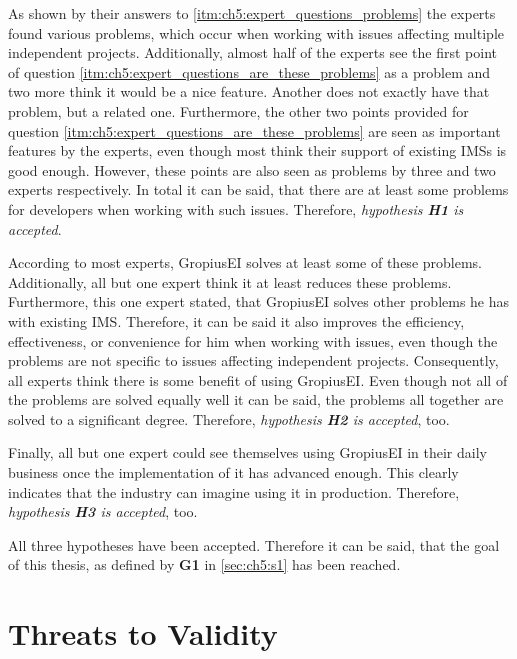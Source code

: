 As shown by their answers to \ref{itm:ch5:expert_questions_problems} the experts found various problems, which occur when working with issues affecting multiple independent projects.
Additionally, almost half of the experts see the first point of question \ref{itm:ch5:expert_questions_are_these_problems} as a problem and two more think it would be a nice feature.
Another does not exactly have that problem, but a related one.
Furthermore, the other two points provided for question \ref{itm:ch5:expert_questions_are_these_problems}  are seen as important features by the experts, even though most think their support of existing \glspl{IMS} is good enough.
However, these points are also seen as problems by three and two experts respectively.
In total it can be said, that there are at least some problems for developers when working with such issues.
Therefore, \emph{hypothesis \textbf{H1} is accepted}.

According to most experts, \gls{GropiusEI} solves at least some of these problems.
Additionally, all but one expert think it at least reduces these problems.
Furthermore, this one expert stated, that \gls{GropiusEI} solves other problems he has with existing \gls{IMS}.
Therefore, it can be said it also improves the efficiency, effectiveness, or convenience for him when working with issues,
even though the problems are not specific to issues affecting independent projects.
Consequently, all experts think there is some benefit of using \gls{GropiusEI}.
Even though not all of the problems are solved equally well it can be said, the problems all together are solved to a significant degree.
Therefore, \emph{hypothesis \textbf{H2} is accepted}, too.

Finally, all but one expert could see themselves using \gls{GropiusEI} in their daily business once the implementation of it has advanced enough.
This clearly indicates that the industry can imagine using it in production.
Therefore, \emph{hypothesis \textbf{H3} is accepted}, too.

All three hypotheses have been accepted. Therefore it can be said, that the goal of this thesis, as defined by \textbf{G1} in \cref{sec:ch5:s1} has been reached.

\section{Threats to Validity}
\label{sec:ch5:s4}

